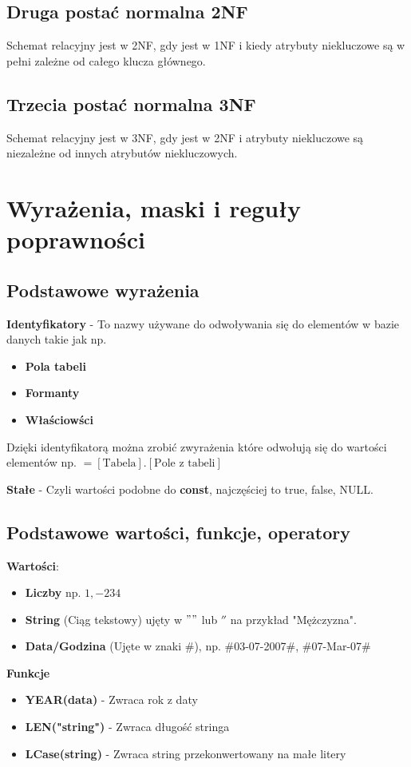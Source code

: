 \documentclass[12pt, a4paper]{article}
\begin{document}
\subsection*{Druga postać normalna 2NF}
Schemat relacyjny jest w 2NF, gdy jest w 1NF i kiedy atrybuty niekluczowe są
w pełni zależne od całego klucza głównego.
\subsection*{Trzecia postać normalna 3NF}
Schemat relacyjny jest w 3NF, gdy jest w 2NF i atrybuty niekluczowe są niezależne od innych
atrybutów niekluczowych.
\section{Wyrażenia, maski i reguły poprawności}
\subsection*{Podstawowe wyrażenia}
\textbf{Identyfikatory} - To nazwy używane do odwoływania się do elementów w bazie danych takie jak np.
\begin{itemize}
  \item \textbf{Pola tabeli}
  \item \textbf{Formanty}
  \item \textbf{Właściowści}
\end{itemize}
Dzięki identyfikatorą można zrobić zwyrażenia które odwołują się do wartości elementów np.
$= [\text{Tabela}].[\text{Pole z tabeli}]$
\vspace{1em}

\textbf{Stałe} - Czyli wartości podobne do \textbf{const}, najczęściej to true, false, NULL.
\subsection*{Podstawowe wartości, funkcje, operatory}
\textbf{Wartości}:
\begin{itemize}
  \item \textbf{Liczby} np. $1, -234$
  \item \textbf{String} (Ciąg tekstowy) ujęty w $""$ lub $''$ na przykład "Mężczyzna".
  \item \textbf{Data/Godzina} (Ujęte w znaki \#), np. \#03-07-2007\#, \#07-Mar-07\#
\end{itemize}
\vspace{1em}

\textbf{Funkcje}
\begin{itemize}
  \item \textbf{YEAR(data)} - Zwraca rok z daty
  \item \textbf{LEN("string")} - Zwraca długość stringa
  \item \textbf{LCase(string)} - Zwraca string przekonwertowany na małe litery
\end{itemize}
\vspace{1em}
\end{document}
